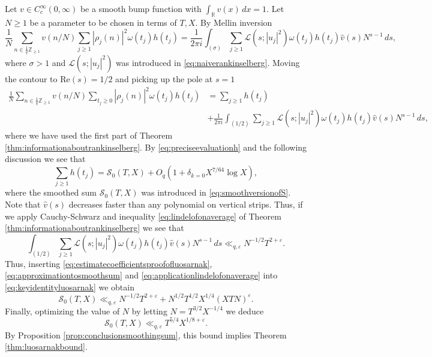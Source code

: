 \documentclass{article}
\theoremstyle{named}
\newcommand{\Z}{\mathbb{Z}}
\renewcommand{\L}{\mathcal{L}}
\renewcommand{\S}{\mathcal{S}}
\newcommand{\R}{\mathbb{R}}
\begin{document}
Let $v \in C_c^\infty(0, \infty)$ be a smooth bump function with $\int_\R v(x)\, dx = 1$. Let $N \geq 1$  be a parameter to be chosen in terms of $T, X$. By Mellin inversion
\begin{equation*}
\frac{1}{N}\sum_{n \in \frac{1}{q}\Z_{\geq 1}} v(n/N)\sum_{j \geq 1} |\rho_j(n)|^2 \omega(t_j)h(t_j) = \frac{1}{2\pi i}\int_{(\sigma)} \sum_{j \geq 1} \L(s; |u_j|^2) \omega(t_j) h(t_j) \widehat{v}(s) N^{s-1}\, ds,
\end{equation*}
where $\sigma > 1$ and $\L(s; |u_j|^2)$ was introduced in \eqref{eq:naiverankinselberg}. Moving the contour to $\text{Re}(s) = 1/2$ and picking up the pole at $s = 1$  
\begin{equation}\label{eq:keyidentityluosarnak}
\begin{aligned}
\frac{1}{N}\sum_{n \in \frac{1}{q}\Z_{\geq 1}} v(n/N)\sum_{t_j \geq 0} |\rho_j(n)|^2 \omega(t_j)h(t_j)  & = \sum_{j \geq 1} h(t_j)\\
&  + \frac{1}{2\pi i}\int_{(1/2)}\sum_{j \geq 1} \L(s; |u_j|^2) \omega(t_j) h(t_j) \widehat{v}(s) N^{s-1}\, ds,
\end{aligned}
\end{equation}
where we have used the first part of Theorem \ref{thm:informationaboutrankinselberg}. By \eqref{eq:preciseevaluationh} and the following discussion we see that  
\begin{equation}\label{eq:approximationtosmoothsum}
    \sum_{j \geq 1} h(t_j) = \S_0(T, X) + O_{q}(1 + \delta_{k = 0} X^{7/64} \log X),
\end{equation}
where the smoothed sum $\S_0(T, X)$ was introduced in \eqref{eq:smoothversionofS}. Note that $\widehat{v}(s)$ decreases faster than any polynomial on vertical strips. Thus, if we apply Cauchy-Schwarz and inequality \eqref{eq:lindelofonaverage} of Theorem \ref{thm:informationaboutrankinselberg} we see that 
\begin{equation}\label{eq:applicationlindelofonaverage}
\int_{(1/2)} \sum_{j \geq 1} \L(s; |u_j|^2) \omega(t_j) h(t_j) \widehat{v}(s) N^{s-1}\, ds \ll_{q, \varepsilon} N^{-1/2}T^{2 + \varepsilon}.
\end{equation}
Thus, inserting \eqref{eq:estimatecoefficientsproofofluosarnak}, \eqref{eq:approximationtosmoothsum} and \eqref{eq:applicationlindelofonaverage} into \eqref{eq:keyidentityluosarnak} we obtain 
\begin{equation*}
    \S_0(T, X) \ll_{q, \varepsilon} N^{-1/2}T^{2 + \varepsilon} + N^{1/2}T^{1/2}X^{1/4}(XTN)^\varepsilon.
\end{equation*}
Finally, optimizing the value of $N$ by letting $N = T^{3/2}X^{-1/4}$ we deduce 
\begin{equation*}
    \S_0(T, X) \ll_{q, \varepsilon} T^{5/4} X^{1/8 + \varepsilon}.
\end{equation*}
By Proposition \ref{prop:conclusionsmoothingsum}, this bound implies Theorem \ref{thm:luosarnakbound}.
\end{document}
